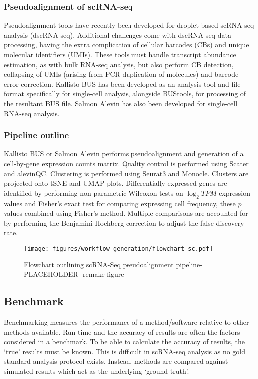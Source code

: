 \subsubsection{Pseudoalignment of scRNA-seq}
Pseudoalignment tools have recently been developed for droplet-based scRNA-seq analysis (dscRNA-seq).
Additional challenges come with dscRNA-seq data processing, having the extra complication of cellular barcodes (CBs) and unique molecular identifiers (UMIs).
These tools must handle transcript abundance estimation, as with bulk RNA-seq analysis, but also perform CB detection, collapsing of UMIs (arising from PCR duplication of molecules) and barcode error correction.
Kallisto BUS\cite{melsted2018barcode} has been developed as an analysis tool and file format specifically for single-cell analysis, alongside BUStools, for processing of the resultant BUS file\cite{melsted2019modular}.
Salmon Alevin\cite{srivastava2019alevin} has also been developed for single-cell RNA-seq analysis.

\subsubsection{Pipeline outline}
Kallisto BUS or Salmon Alevin performs pseudoalignment and generation of a cell-by-gene expression counts matrix.
Quality control is performed using Scater\cite{mccarthy2017scater} and alevinQC.
Clustering is performed using Seurat3\cite{stuart2019comprehensive} and Monocle\cite{trapnell2014dynamics}.
Clusters are projected onto tSNE and UMAP plots.
Differentially expressed genes are identified by performing non-parametric Wilcoxon tests on $\log_2 TPM$ expression values and Fisher's exact test for comparing expressing cell frequency, these $p$ values combined using Fisher's method.
Multiple comparisons are accounted for by performing the Benjamini-Hochberg correction to adjust the false discovery rate.

\begin{figure}[htbp]
\centering
\texttt{[image: figures/workflow\_generation/flowchart\_sc.pdf]}
\caption[scRNA-Seq pseudoalignment pipeline flowchart]{Flowchart outlining scRNA-Seq pseudoalignment pipeline- PLACEHOLDER- remake figure}
\label{fig:flowchart_scRNA}
\end{figure}

\subsection{Benchmark}\label{subsec:sc_bench}
Benchmarking measures the performance of a method/software relative to other methods available.
Run time and the accuracy of results are often the factors considered in a benchmark.
To be able to calculate the accuracy of results, the `true' results must be known.
This is difficult in scRNA-seq analysis as no gold standard analysis protocol exists.
Instead, methods are compared against simulated results which act as the underlying `ground truth'.

